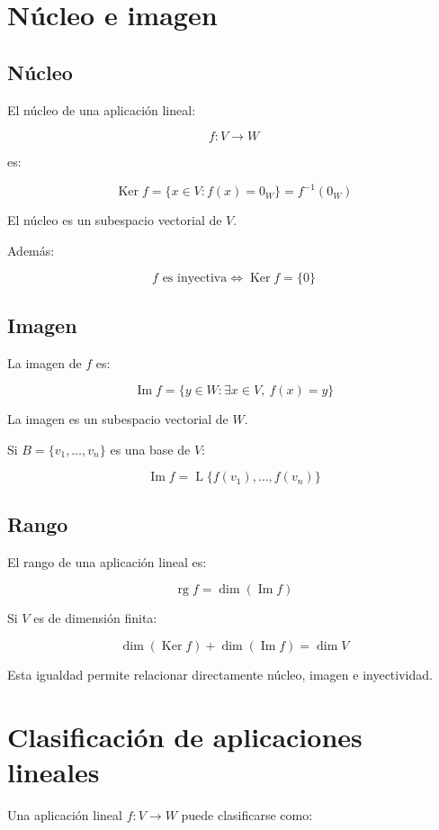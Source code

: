 \documentclass[11pt,a4paper]{article}
\newcommand{\Ker}{\operatorname{Ker}}
\newcommand{\Ima}{\operatorname{Im}}
\newcommand{\rg}{\operatorname{rg}}
\newcommand{\Span}{\operatorname{L}}
\begin{document}
\section{Núcleo e imagen}

\subsection{Núcleo}

El núcleo de una aplicación lineal:

\[
f:V\longrightarrow W
\]

es:

\[
\boxed{
\Ker f
=
\{x\in V:f(x)=0_W\}
=
f^{-1}(0_W)
}
\]

El núcleo es un subespacio vectorial de $V$.

Además:

\[
\boxed{
f\text{ es inyectiva}
\iff
\Ker f=\{0\}
}
\]

\subsection{Imagen}

La imagen de $f$ es:

\[
\boxed{
\Ima f
=
\{y\in W:
\exists x\in V,\ f(x)=y
\}
}
\]

La imagen es un subespacio vectorial de $W$.

Si $B=\{v_1,\ldots,v_n\}$ es una base de $V$:

\[
\Ima f
=
\Span\{f(v_1),\ldots,f(v_n)\}
\]

\subsection{Rango}

El rango de una aplicación lineal es:

\[
\boxed{
\rg f=\dim(\Ima f)
}
\]

Si $V$ es de dimensión finita:

\[
\boxed{
\dim(\Ker f)+\dim(\Ima f)=\dim V
}
\]

Esta igualdad permite relacionar directamente núcleo, imagen e inyectividad.

\section{Clasificación de aplicaciones lineales}

Una aplicación lineal $f:V\to W$ puede clasificarse como:
\end{document}
